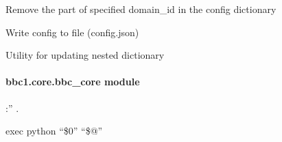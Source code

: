 \documentclass[letterpaper,10pt,english]{sphinxmanual}
\begin{document}
\begin{fulllineitems}
\begin{fulllineitems}
\end{fulllineitems}


\begin{fulllineitems}
\label{\detokenize{bbc1.core.bbc_config:bbc1.core.bbc_config.BBcConfig.remove_domain_config}}
Remove the part of specified domain\_id in the config dictionary

\end{fulllineitems}


\begin{fulllineitems}
\label{\detokenize{bbc1.core.bbc_config:bbc1.core.bbc_config.BBcConfig.update_config}}
Write config to file (config.json)

\end{fulllineitems}


\end{fulllineitems}


\begin{fulllineitems}
\label{\detokenize{bbc1.core.bbc_config:bbc1.core.bbc_config.update_deep}}
Utility for updating nested dictionary

\end{fulllineitems}



\paragraph{bbc1.core.bbc\_core module}
\label{\detokenize{bbc1.core.bbc_core::doc}}\label{\detokenize{bbc1.core.bbc_core:bbc1-core-bbc-core-module}}\label{\detokenize{bbc1.core.bbc_core:module-bbc1.core.bbc_core}}
:” .

exec python “\$0” “\$@”
\end{document}
